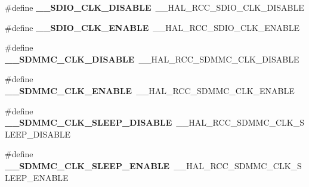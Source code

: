 \begin{DoxyCompactItemize}
\item 
\hypertarget{group___h_a_l___r_c_c___aliased_ga582de62052cae4fb4a6955b515856c1b}{\#define {\bfseries \-\_\-\-\_\-\-S\-D\-I\-O\-\_\-\-C\-L\-K\-\_\-\-D\-I\-S\-A\-B\-L\-E}~\-\_\-\-\_\-\-H\-A\-L\-\_\-\-R\-C\-C\-\_\-\-S\-D\-I\-O\-\_\-\-C\-L\-K\-\_\-\-D\-I\-S\-A\-B\-L\-E}\label{group___h_a_l___r_c_c___aliased_ga582de62052cae4fb4a6955b515856c1b}

\item 
\hypertarget{group___h_a_l___r_c_c___aliased_ga49ae2415b1c5125e73624a4a1ca58daf}{\#define {\bfseries \-\_\-\-\_\-\-S\-D\-I\-O\-\_\-\-C\-L\-K\-\_\-\-E\-N\-A\-B\-L\-E}~\-\_\-\-\_\-\-H\-A\-L\-\_\-\-R\-C\-C\-\_\-\-S\-D\-I\-O\-\_\-\-C\-L\-K\-\_\-\-E\-N\-A\-B\-L\-E}\label{group___h_a_l___r_c_c___aliased_ga49ae2415b1c5125e73624a4a1ca58daf}

\item 
\hypertarget{group___h_a_l___r_c_c___aliased_gab78a805200c4766a0af323d852e73c34}{\#define {\bfseries \-\_\-\-\_\-\-S\-D\-M\-M\-C\-\_\-\-C\-L\-K\-\_\-\-D\-I\-S\-A\-B\-L\-E}~\-\_\-\-\_\-\-H\-A\-L\-\_\-\-R\-C\-C\-\_\-\-S\-D\-M\-M\-C\-\_\-\-C\-L\-K\-\_\-\-D\-I\-S\-A\-B\-L\-E}\label{group___h_a_l___r_c_c___aliased_gab78a805200c4766a0af323d852e73c34}

\item 
\hypertarget{group___h_a_l___r_c_c___aliased_gad592b2db4f3a4336e7083a5bbce52de0}{\#define {\bfseries \-\_\-\-\_\-\-S\-D\-M\-M\-C\-\_\-\-C\-L\-K\-\_\-\-E\-N\-A\-B\-L\-E}~\-\_\-\-\_\-\-H\-A\-L\-\_\-\-R\-C\-C\-\_\-\-S\-D\-M\-M\-C\-\_\-\-C\-L\-K\-\_\-\-E\-N\-A\-B\-L\-E}\label{group___h_a_l___r_c_c___aliased_gad592b2db4f3a4336e7083a5bbce52de0}

\item 
\hypertarget{group___h_a_l___r_c_c___aliased_ga3a7400ba40970d1010750ae7274d07a8}{\#define {\bfseries \-\_\-\-\_\-\-S\-D\-M\-M\-C\-\_\-\-C\-L\-K\-\_\-\-S\-L\-E\-E\-P\-\_\-\-D\-I\-S\-A\-B\-L\-E}~\-\_\-\-\_\-\-H\-A\-L\-\_\-\-R\-C\-C\-\_\-\-S\-D\-M\-M\-C\-\_\-\-C\-L\-K\-\_\-\-S\-L\-E\-E\-P\-\_\-\-D\-I\-S\-A\-B\-L\-E}\label{group___h_a_l___r_c_c___aliased_ga3a7400ba40970d1010750ae7274d07a8}

\item 
\hypertarget{group___h_a_l___r_c_c___aliased_ga874ca8e609a1707ee05251ea08cbcc02}{\#define {\bfseries \-\_\-\-\_\-\-S\-D\-M\-M\-C\-\_\-\-C\-L\-K\-\_\-\-S\-L\-E\-E\-P\-\_\-\-E\-N\-A\-B\-L\-E}~\-\_\-\-\_\-\-H\-A\-L\-\_\-\-R\-C\-C\-\_\-\-S\-D\-M\-M\-C\-\_\-\-C\-L\-K\-\_\-\-S\-L\-E\-E\-P\-\_\-\-E\-N\-A\-B\-L\-E}\label{group___h_a_l___r_c_c___aliased_ga874ca8e609a1707ee05251ea08cbcc02}


\end{DoxyCompactItemize}
